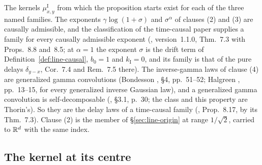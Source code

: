 The kernels $\mu^{\mathrm I}_{x,y}$ from which the proposition starts exist for each of the
three named families. The exponents
$\gamma\log(1+\sigma)$ and $\sigma^\alpha$ of clauses (2) and (3) are causally admissible, and
the classification of the time-causal paper supplies a family for every causally admissible
exponent (, version~1.1.0, Thm.~7.3 with Props.~8.8 and~8.5;
at $\alpha = 1$ the exponent $\sigma$ is the drift term of Definition~\ref{def:line-causal},
$b_0 = 1$ and $k_{\mathrm I} = 0$, and its family is that of the pure delays $\delta_{y-x}$,
Cor.~7.4 and Rem.~7.5 there). The inverse-gamma laws of clause (4) are generalized gamma
convolutions (Bondesson , \S4, pp.~51--52; Halgreen
, pp.~13--15, for every generalized inverse Gaussian law), and a
generalized gamma convolution is self-decomposable (, \S3.1,
p.~30; the class and this property are Thorin's). So they are the delay laws of a time-causal
family (, Prop.~8.17, by its Thm.~7.3). Clause (2)
is the \Matern{} member of \S\ref{sec:line-origin} at range $1/\sqrt2$, carried to $\mathbb{R}^d$ with
the same index.

\subsection{The kernel at its centre}\label{sec:isotropic-origin}

